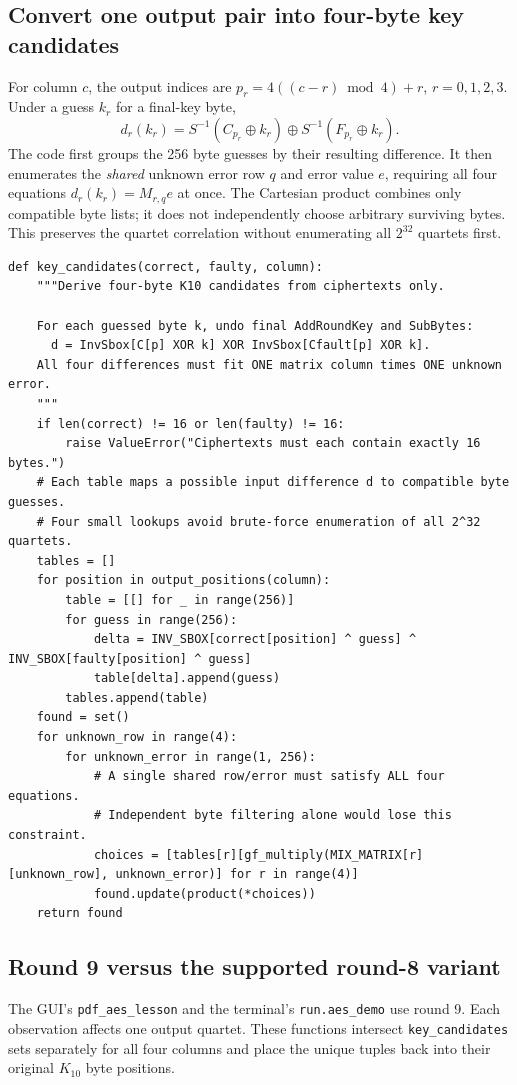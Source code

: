 \documentclass[11pt,a4paper]{report}
\newcommand{\xor}{\mathbin{\oplus}}
\begin{document}
\subsection{Convert one output pair into four-byte key candidates}
For column $c$, the output indices are $p_r=4((c-r)\bmod4)+r$, $r=0,1,2,3$. Under a guess $k_r$ for a final-key byte,
\[
d_r(k_r)=S^{-1}(C_{p_r}\xor k_r)\xor S^{-1}(F_{p_r}\xor k_r).
\]
The code first groups the 256 byte guesses by their resulting difference. It then enumerates the \emph{shared} unknown error row $q$ and error value $e$, requiring all four equations $d_r(k_r)=M_{r,q}e$ at once. The Cartesian product combines only compatible byte lists; it does not independently choose arbitrary surviving bytes. This preserves the quartet correlation without enumerating all $2^{32}$ quartets first.
\begin{lstlisting}[style=pycode,caption={Piret candidate quartets with one shared row and error}]
def key_candidates(correct, faulty, column):
    """Derive four-byte K10 candidates from ciphertexts only.

    For each guessed byte k, undo final AddRoundKey and SubBytes:
      d = InvSbox[C[p] XOR k] XOR InvSbox[Cfault[p] XOR k].
    All four differences must fit ONE matrix column times ONE unknown error.
    """
    if len(correct) != 16 or len(faulty) != 16:
        raise ValueError("Ciphertexts must each contain exactly 16 bytes.")
    # Each table maps a possible input difference d to compatible byte guesses.
    # Four small lookups avoid brute-force enumeration of all 2^32 quartets.
    tables = []
    for position in output_positions(column):
        table = [[] for _ in range(256)]
        for guess in range(256):
            delta = INV_SBOX[correct[position] ^ guess] ^ INV_SBOX[faulty[position] ^ guess]
            table[delta].append(guess)
        tables.append(table)
    found = set()
    for unknown_row in range(4):
        for unknown_error in range(1, 256):
            # A single shared row/error must satisfy ALL four equations.
            # Independent byte filtering alone would lose this constraint.
            choices = [tables[r][gf_multiply(MIX_MATRIX[r][unknown_row], unknown_error)] for r in range(4)]
            found.update(product(*choices))
    return found
\end{lstlisting}

\subsection{Round 9 versus the supported round-8 variant}
The GUI's \texttt{pdf\_aes\_lesson} and the terminal's \texttt{run.aes\_demo} use round 9. Each observation affects one output quartet. These functions intersect \texttt{key\_candidates} sets separately for all four columns and place the unique tuples back into their original $K_{10}$ byte positions.
\end{document}
